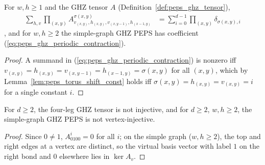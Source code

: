 \begin{lemma}%
    \label{thm:peps_ghz_state}
    \leanok
    For $w,h\ge1$ and the GHZ tensor $A$ (Definition~\ref{def:peps_ghz_tensor}),
    \begin{align}
        \sum_{h,v}\prod_{(x,y)}
        A^{\sigma(x,y)}_{v_{(x,y)},h_{(x,y)},v_{(x,y-1)},h_{(x-1,y)}}
         & = \sum_{i=0}^{d-1}\prod_{(x,y)}\delta_{\sigma(x,y),i}
        \label{eq:peps_ghz_periodic_contraction}
    \end{align}
    \cite[Appendix~A, ``The GHZ state'']{Cirac2021Matrix}, and for $w,h\ge2$
    the simple-graph GHZ PEPS has coefficient (\ref{eq:peps_ghz_periodic_contraction}).
\end{lemma}

\begin{proof}\leanok
    A summand in (\ref{eq:peps_ghz_periodic_contraction}) is nonzero iff
    $v_{(x,y)}=h_{(x,y)}=v_{(x,y-1)}=h_{(x-1,y)}=\sigma(x,y)$ for all $(x,y)$,
    which by Lemma~\ref{lem:peps_torus_shift_const} holds iff
    $\sigma(x,y)=h_{(x,y)}=v_{(x,y)}=i$ for a single constant $i$.
\end{proof}

\begin{lemma}
    \label{thm:peps_ghz_not_injective}
    \leanok
    For $d\ge2$, the four-leg GHZ tensor is not injective, and for $d\ge2$,
    $w,h\ge2$, the simple-graph GHZ PEPS is not vertex-injective.
\end{lemma}

\begin{proof}\leanok
    Since $0\neq 1$, $A^i_{0100}=0$ for all $i$; on the simple graph ($w,h\ge 2$),
    the top and right edges at a vertex are distinct, so the virtual basis
    vector with label $1$ on the right bond and $0$ elsewhere lies in $\ker A_v$.
\end{proof}


